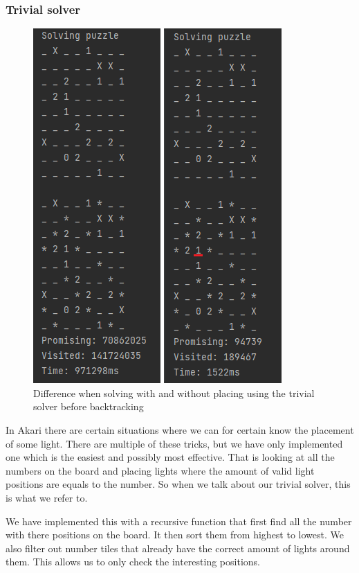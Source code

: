 \documentclass[12pt]{article}
\begin{document}
\subsubsection{Trivial solver}\label{trivialsolver}
\begin{figure}
    \begin{center}
    \centering
    \includegraphics[scale=0.7]{doc/deterministic_vs_backtracking_only_hard.png}
    \caption{Difference when solving with and without placing using the trivial solver before backtracking}
    \label{fig:det_vs_back}
    \end{center}
\end{figure}


In Akari there are certain situations where we can for certain know the placement of some light. There are multiple of these tricks, but we have only implemented one which is the easiest and possibly most effective. That is looking at all the numbers on the board and placing lights where the amount of valid light positions are equals to the number. So when we talk about our trivial solver, this is what we refer to.

We have implemented this with a recursive function that first find all the number with there positions on the board. It then sort them from highest to lowest. We also filter out number tiles that already have the correct amount of lights around them. This allows us to only check the interesting positions. 
\end{document}
